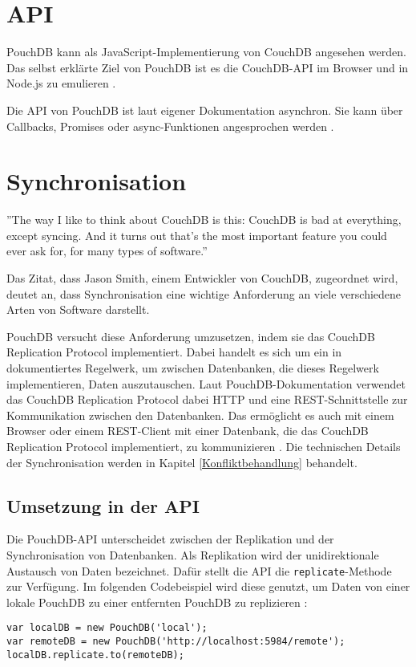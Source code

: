 \section{API}
\label{API}
PouchDB kann als JavaScript-Implementierung von CouchDB angesehen werden. Das selbst erklärte Ziel von PouchDB ist es die CouchDB-API im Browser und in Node.js zu emulieren \cite{pouch:intro}. 

Die API von PouchDB ist laut eigener Dokumentation asynchron. Sie kann über Callbacks, Promises oder async-Funktionen angesprochen werden \cite{pouch:api}.


\section{Synchronisation}
\label{Synchronisation}
\begin{citeenv}
''The way I like to think about CouchDB is this: CouchDB is bad at everything, except syncing. And it turns out that's the most important feature you could ever ask for, for many types of software.'' \cite{pouch:replication}
\end{citeenv}

Das Zitat, dass Jason Smith, einem Entwickler von CouchDB, zugeordnet wird, deutet an, dass Synchronisation eine wichtige Anforderung an viele verschiedene Arten von Software darstellt.

PouchDB versucht diese Anforderung umzusetzen, indem sie das CouchDB Replication Protocol implementiert. Dabei handelt es sich um ein in \cite{apache:replication} dokumentiertes Regelwerk, um zwischen Datenbanken, die dieses Regelwerk implementieren, Daten auszutauschen. Laut PouchDB-Dokumentation verwendet das CouchDB Replication Protocol dabei HTTP und eine REST-Schnittstelle zur Kommunikation zwischen den Datenbanken. Das ermöglicht es auch mit einem Browser oder einem REST-Client mit einer Datenbank, die das CouchDB Replication Protocol implementiert, zu kommunizieren \cite{pouch:intro}. Die technischen Details der Synchronisation werden in Kapitel \ref{Konfliktbehandlung} behandelt.


\subsection{Umsetzung in der API}
Die PouchDB-API unterscheidet zwischen der Replikation und der Synchronisation von Datenbanken. Als Replikation wird der unidirektionale Austausch von Daten bezeichnet. Dafür stellt die API die \texttt{replicate}-Methode zur Verfügung. Im folgenden Codebeispiel wird diese genutzt, um Daten von einer lokale PouchDB zu einer entfernten PouchDB zu replizieren \cite{pouch:replication}:
\begin{codebox}
\begin{lstlisting}[style=typescript]
var localDB = new PouchDB('local');
var remoteDB = new PouchDB('http://localhost:5984/remote');
localDB.replicate.to(remoteDB);
\end{lstlisting}
\end{codebox}


